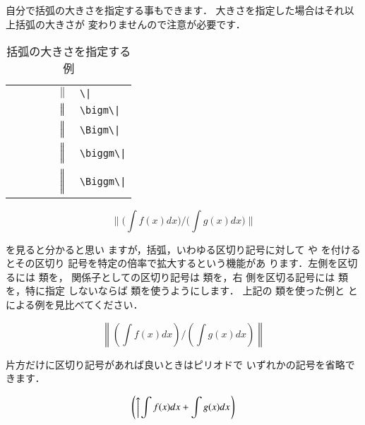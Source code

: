 %
自分で括弧の大きさを指定する事もできます．
大きさを指定した場合はそれ以上括弧の大きさが
変わりませんので注意が必要です．
\begin{table}[htbp]
\begin{scenter}
\caption{括弧の大きさを指定する例}
%
%
\begin{tabular}{LCCCC}
\m{/}      & \m{(}       & \m{)}       & \m{|}       &
  $\|$      & \verb+\|+\\
\m{\big/}  & \m{\bigl(}  & \m{\bigr)}  & \m{\bigm|}  &
  $\bigm\|$ & \verb+\bigm\|+\\[4pt]
\m{\Big/}  & \m{\Bigl(}  & \m{\Bigr)}  & \m{\Bigm|}  &
  $\Bigm\|$ & \verb+\Bigm\|+\\[5pt]
\m{\bigg/} & \m{\biggl(} & \m{\biggr)} & \m{\biggm|} &
  $\biggm\|$&  \verb+\biggm\|+\\[6pt]
\m{\Bigg/} & \m{\Biggl(} & \m{\Biggr)} & \m{\Biggm|} &
  $\Biggm\|$&  \verb+\Biggm\|+\\[7pt]
\end{tabular}
\end{scenter}
\end{table}
%
\begin{InOut}
\begin{displaymath}
\Biggl\| \Biggl(\int f(x) dx\Biggr) 
  \Bigg/ \Biggl(\int g(x) dx\Biggr) 
\Biggr\| 
\end{displaymath}
\end{InOut}
を見ると分かると思い
ますが，括弧，いわゆる区切り記号に対して 
や を付けるとその区切り
記号を特定の倍率で拡大するという機能があ%
ります．左側を区切るには 類を，
関係子としての区切り記号は 類を，右
側を区切る記号には 類を，特に指定
しないならば 類を使うようにします．
上記の 類を使った例と 
と による例を見比べてください．
\begin{InOut}
\[ \left\| 
 \left(\int f(x) dx\right) 
 \Bigg/ \left(\int g(x) dx\right) 
 \right\| \]
\end{InOut}
片方だけに区切り記号があれば良いときはピリオドで
いずれかの記号を省略できます．
\begin{InOut}
\[ \left( \left\uparrow 
   \int f(x)dx + \int g(x)dx
   \right. \right) \] 
\end{InOut}

